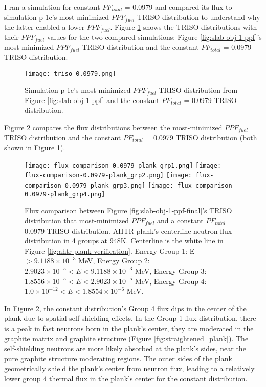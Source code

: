 I ran a simulation for constant $PF_{total}$ = 0.0979 and compared its 
flux to simulation p-1c's most-minimized $PPF_{fuel}$ TRISO distribution to understand 
why the latter enabled a lower $PPF_{fuel}$. 
Figure \ref{fig:triso-0.0979} shows the TRISO distributions with their $PPF_{fuel}$ 
values for the two compared simulations: Figure \ref{fig:slab-obj-1-ppf}'s 
most-minimized $PPF_{fuel}$ TRISO distribution and the constant $PF_{total}$ = 0.0979 
TRISO distribution. 
\begin{figure}[htbp!]
    \centering
    \texttt{[image: triso-0.0979.png]} 
    \caption{Simulation p-1c's most-minimized $PPF_{fuel}$ TRISO distribution 
    from Figure \ref{fig:slab-obj-1-ppf} and the constant $PF_{total}$ = 0.0979 
    TRISO distribution.}
    \label{fig:triso-0.0979}
\end{figure}

Figure \ref{fig:flux-comparison-0.0979-plank} compares the flux distributions between 
the most-minimized $PPF_{fuel}$ TRISO distribution and the constant $PF_{total}$ = 0.0979 
TRISO distribution (both shown in Figure \ref{fig:triso-0.0979}).
\begin{figure}[htbp!]
    \centering
    \texttt{[image: flux-comparison-0.0979-plank\_grp1.png]} 
    \texttt{[image: flux-comparison-0.0979-plank\_grp2.png]} 
    \texttt{[image: flux-comparison-0.0979-plank\_grp3.png]} 
    \texttt{[image: flux-comparison-0.0979-plank\_grp4.png]} 
    \caption{Flux comparison between Figure \ref{fig:slab-obj-1-ppf-final}'s TRISO 
    distribution that most-minimized $PPF_{fuel}$ and a constant $PF_{total}$ = 0.0979 
    TRISO distribution. 
    \acrfull{AHTR} plank's centerline neutron flux distribution in 4 groups at 948K. 
    Centerline is the white line in Figure \ref{fig:ahtr-plank-verification}.
    Energy Group 1: E $> 9.1188 \times 10^{-3}$ MeV, 
    Energy Group 2: $2.9023 \times 10^{-5} < E < 9.1188 \times 10^{-3}$ MeV,
    Energy Group 3:  $1.8556 \times 10^{-5} < E < 2.9023 \times 10^{-5}$ MeV,
    Energy Group 4:  $1.0 \times 10^{-12} < E < 1.8554 \times 10^{-6}$ MeV.}
    \label{fig:flux-comparison-0.0979-plank}
\end{figure}

In Figure \ref{fig:flux-comparison-0.0979-plank}, the constant distribution's Group 4 
flux dips in the center of the plank due to spatial self-shielding effects. 
In the Group 1 flux distribution, there is a peak in fast neutrons born in the plank's 
center, they are moderated in the graphite matrix and graphite structure 
(Figure \ref{fig:straightened_plank}). 
The self-shielding neutrons are more likely absorbed at the plank's sides, near 
the pure graphite structure moderating regions. 
The outer sides of the plank geometrically shield the plank's center from neutron 
flux, leading to a relatively lower group 4 thermal flux in the plank's center for 
the constant distribution. 

